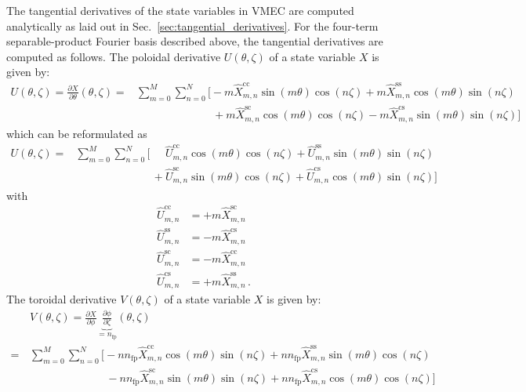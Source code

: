 The tangential derivatives of the state variables in VMEC are computed analytically
as laid out in Sec.~\ref{sec:tangential_derivatives}.
For the four-term separable-product Fourier basis described above,
the tangential derivatives are computed as follows.
The poloidal derivative $U(\theta,\zeta)$ of a state variable $X$ is given by:
\begin{align}
  U(\theta,\zeta) = \frac{\partial X}{\partial \theta} (\theta, \zeta)
  =&          \sum_{m=0}^M \sum_{n=0}^N \Biggl[    - m \hat{X}_{m,n}^\mathrm{cc} \sin(m \theta) \cos(n \zeta)
                                                   + m \hat{X}_{m,n}^\mathrm{ss} \cos(m \theta) \sin(n \zeta) \nonumber \\
  ~& \phantom{\sum_{m=0}^M \sum_{n=0}^N \Biggl[}\, + m \hat{X}_{m,n}^\mathrm{sc} \cos(m \theta) \cos(n \zeta)
                                                   - m \hat{X}_{m,n}^\mathrm{cs} \sin(m \theta) \sin(n \zeta) \Biggr]
\end{align}
which can be reformulated as
\begin{align}
  U(\theta,\zeta)
  =&          \sum_{m=0}^M \sum_{n=0}^N \Biggl[    \phantom{+}\, \hat{U}_{m,n}^\mathrm{cc} \cos(m \theta) \cos(n \zeta)
                                                            +    \hat{U}_{m,n}^\mathrm{ss} \sin(m \theta) \sin(n \zeta) \nonumber \\
  ~& \phantom{\sum_{m=0}^M \sum_{n=0}^N \Biggl[}\,          +    \hat{U}_{m,n}^\mathrm{sc} \sin(m \theta) \cos(n \zeta)
                                                            +    \hat{U}_{m,n}^\mathrm{cs} \cos(m \theta) \sin(n \zeta) \Biggr]
\end{align}
with
\begin{align}
  \hat{U}_{m,n}^\mathrm{cc} &= + m \hat{X}_{m,n}^\mathrm{sc} \\
  \hat{U}_{m,n}^\mathrm{ss} &= - m \hat{X}_{m,n}^\mathrm{cs} \\
  \hat{U}_{m,n}^\mathrm{sc} &= - m \hat{X}_{m,n}^\mathrm{cc} \\
  \hat{U}_{m,n}^\mathrm{cs} &= + m \hat{X}_{m,n}^\mathrm{ss} \, .
\end{align}
The toroidal derivative $V(\theta,\zeta)$ of a state variable $X$ is given by:
\begin{align}
  ~&\, V(\theta,\zeta) = \frac{\partial X}{\partial \phi} \underbrace{\frac{\partial \phi}{\partial \zeta}}_{= n_\mathrm{fp}} (\theta, \zeta) \nonumber \\
  =&\,          \sum_{m=0}^M \sum_{n=0}^N \Biggl[    - n n_\mathrm{fp} \hat{X}_{m,n}^\mathrm{cc} \cos(m \theta) \sin(n \zeta)
                                                     + n n_\mathrm{fp} \hat{X}_{m,n}^\mathrm{ss} \sin(m \theta) \cos(n \zeta) \nonumber \\
  ~&\, \phantom{\sum_{m=0}^M \sum_{n=0}^N \Biggl[}\, - n n_\mathrm{fp} \hat{X}_{m,n}^\mathrm{sc} \sin(m \theta) \sin(n \zeta)
                                                     + n n_\mathrm{fp} \hat{X}_{m,n}^\mathrm{cs} \cos(m \theta) \cos(n \zeta) \Biggr]
\end{align}
